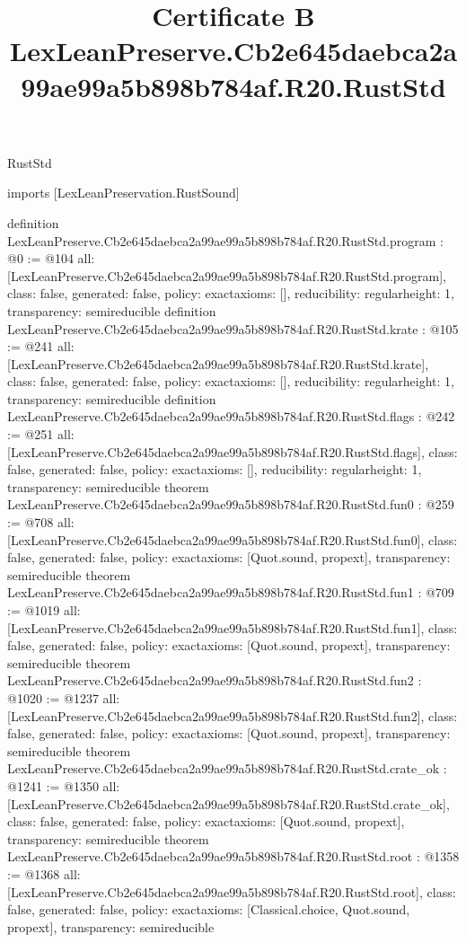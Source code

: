 \begin{lexlean}{RustStd}
\title{Certificate B LexLeanPreserve.Cb2e645daebca2a99ae99a5b898b784af.R20.RustStd}
\begin{coremodule}
imports [LexLeanPreservation.RustSound]

definition LexLeanPreserve.Cb2e645daebca2a99ae99a5b898b784af.R20.RustStd.program : @0 := @104 {
  all: [LexLeanPreserve.Cb2e645daebca2a99ae99a5b898b784af.R20.RustStd.program],
  class: false,
  generated: false,
  policy: exact{axioms: []},
  reducibility: regular{height: 1},
  transparency: semireducible
}
definition LexLeanPreserve.Cb2e645daebca2a99ae99a5b898b784af.R20.RustStd.krate : @105 := @241 {
  all: [LexLeanPreserve.Cb2e645daebca2a99ae99a5b898b784af.R20.RustStd.krate],
  class: false,
  generated: false,
  policy: exact{axioms: []},
  reducibility: regular{height: 1},
  transparency: semireducible
}
definition LexLeanPreserve.Cb2e645daebca2a99ae99a5b898b784af.R20.RustStd.flags : @242 := @251 {
  all: [LexLeanPreserve.Cb2e645daebca2a99ae99a5b898b784af.R20.RustStd.flags],
  class: false,
  generated: false,
  policy: exact{axioms: []},
  reducibility: regular{height: 1},
  transparency: semireducible
}
theorem LexLeanPreserve.Cb2e645daebca2a99ae99a5b898b784af.R20.RustStd.fun0 : @259 := @708 {
  all: [LexLeanPreserve.Cb2e645daebca2a99ae99a5b898b784af.R20.RustStd.fun0],
  class: false,
  generated: false,
  policy: exact{axioms: [Quot.sound, propext]},
  transparency: semireducible
}
theorem LexLeanPreserve.Cb2e645daebca2a99ae99a5b898b784af.R20.RustStd.fun1 : @709 := @1019 {
  all: [LexLeanPreserve.Cb2e645daebca2a99ae99a5b898b784af.R20.RustStd.fun1],
  class: false,
  generated: false,
  policy: exact{axioms: [Quot.sound, propext]},
  transparency: semireducible
}
theorem LexLeanPreserve.Cb2e645daebca2a99ae99a5b898b784af.R20.RustStd.fun2 : @1020 := @1237 {
  all: [LexLeanPreserve.Cb2e645daebca2a99ae99a5b898b784af.R20.RustStd.fun2],
  class: false,
  generated: false,
  policy: exact{axioms: [Quot.sound, propext]},
  transparency: semireducible
}
theorem LexLeanPreserve.Cb2e645daebca2a99ae99a5b898b784af.R20.RustStd.crate_ok : @1241 := @1350 {
  all: [LexLeanPreserve.Cb2e645daebca2a99ae99a5b898b784af.R20.RustStd.crate_ok],
  class: false,
  generated: false,
  policy: exact{axioms: [Quot.sound, propext]},
  transparency: semireducible
}
theorem LexLeanPreserve.Cb2e645daebca2a99ae99a5b898b784af.R20.RustStd.root : @1358 := @1368 {
  all: [LexLeanPreserve.Cb2e645daebca2a99ae99a5b898b784af.R20.RustStd.root],
  class: false,
  generated: false,
  policy: exact{axioms: [Classical.choice, Quot.sound, propext]},
  transparency: semireducible
}


\end{coremodule}
\end{lexlean}
